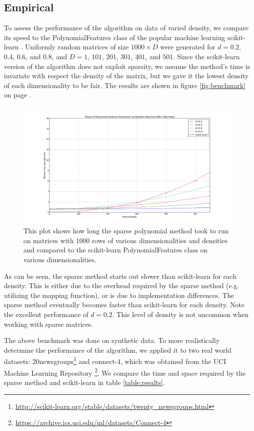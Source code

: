 \documentclass[11pt,onecolumn]{article}
\begin{document}
\subsection{Empirical}
To assess the performance of the algorithm on data of varied density, we compare its speed
to the PolynomialFeatures class of the popular machine learning scikit-learn \cite{scikit-learn}.
Uniformly random matrices of size $1000 \times D$ were generated for $d=0.2$, $0.4$, $0.6$, and $0.8$, and 
$D=1$, $101$, $201$, $301$, $401$, and $501$. Since the scikit-learn version of the algorithm
does not exploit sparsity, we assume the method's time is invariate with respect the density of the matrix, but
we gave it the lowest density of each dimensionality to be fair. The results are shown in figure \eqref{fig:benchmark} on page \pageref{fig:benchmark}.

\begin{figure}[ht!, numbered]
    \includegraphics[scale=0.3]{benchmark_results.png}
    \caption{This plot shows how long the sparse polynomial method took to run on matrices with 1000 rows of various dimensionalities and densities and compared to the scikit-learn PolynomialFeatures class on various dimensionalities.}
    \label{fig:benchmark}
    \centering
\end{figure}

As can be seen, the sparse method starts out slower than scikit-learn for each density. This
is either due to the overhead required by the sparse method (e.g. utilizing the mapping function),
or is due to implementation differences. The sparse method eventually becomes faster than scikit-learn
for each density. Note the excellent performance of $d=0.2$. This level of density is not uncommon when
working with sparse matrices.

The above benchmark was done on synthetic data. To more realistically determine the performance of
the algorithm, we applied it to two real world datasets: 20newsgroups\footnote{\url{http://scikit-learn.org/stable/datasets/twenty_newsgroups.html}} and connect-4, which was obtained
from the UCI Machine Learning Repository \cite{Lichman:2013}\footnote{\url{https://archive.ics.uci.edu/ml/datasets/Connect-4}}. We compare the time and space required by the sparse method and scikit-learn in table \eqref{table:results}.
\end{document}
